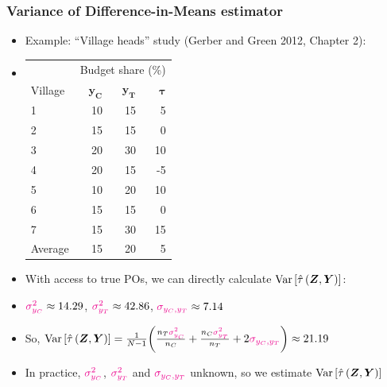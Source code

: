 \documentclass[table, xcolor = {dvipsnames}, 9pt]{beamer}
\theoremstyle{plain}
\newcommand{\mh}[1]{{\color{magenta}{#1}}}
\DeclareMathOperator{\Var}{\rm{Var}}
\begin{document}
\begin{frame}
\frametitle{Variance of Difference-in-Means estimator}
\begin{itemize}
\item Example: ``Village heads'' study (Gerber and Green 2012, Chapter 2): \vspace{0.1in}
\item[]
\begin{center}
\begin{tabular}{l|rrr} \hline
& \multicolumn{3}{c}{Budget share (\%)} \\
Village &$\bm{y_C}$& $\bm{y_T}$& $\bm{\tau}$  \\ \hline
1& 10 & 15  & 5  \\
2& 15 & 15  & 0   \\ 
3& 20 & 30  & 10   \\
4& 20 & 15  & -5   \\
5& 10 & 20  & 10   \\
6& 15 & 15  & 0   \\
7& 15 & 30  & 15   \\ \hline
Average & 15 & 20 & 5  \\ \hline
\end{tabular}
\end{center} \vspace{0.5em} \pause
\item With access to true POs, we can directly calculate $\Var\left[\hat{\tau}\left(\bm{Z}, \bm{Y}\right)\right]$: \vspace{0.5em}
\item[] $\mh{\sigma^2_{y_C}} \approx 14.29$, $\mh{\sigma^2_{y_T}} \approx 42.86$, $\mh{\sigma_{y_C, y_T}} \approx 7.14$ \vspace{0.5em}
\item So, $\Var\left[\hat{\tau}\left(\bm{Z}, \bm{Y}\right)\right] = \frac{1}{N - 1}\bigg(\frac{n_T \mh{\sigma^2_{y_C}}}{n_C} + \frac{n_C \mh{\sigma^2_{y_T}}}{n_T} + 2\mh{\sigma_{y_C, y_T}}\bigg) \approx 21.19$ \pause \vspace{0.5em}
\item In practice, $\mh{\sigma^2_{y_C}}$, $\mh{\sigma^2_{y_T}}$ and $\mh{\sigma_{y_C, y_T}}$ unknown, so we estimate $\Var\left[\hat{\tau}\left(\bm{Z}, \bm{Y}\right)\right]$
\end{itemize}
\end{frame}
\end{document}
